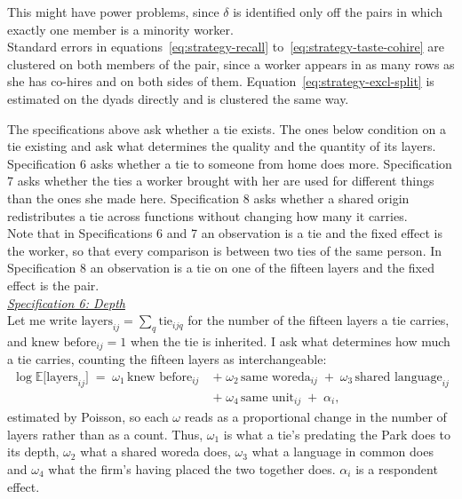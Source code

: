 \noindent This might have power problems, since $\delta$ is identified only off the \pnChanExclOutPairs{} pairs in which exactly one member is a minority worker. \\

\noindent Standard errors in equations~\eqref{eq:strategy-recall} to~\eqref{eq:strategy-taste-cohire} are clustered on both members of the pair, since a worker appears in as many rows as she has co-hires and on both sides of them. Equation~\eqref{eq:strategy-excl-split} is estimated on the dyads directly and is clustered the same way. \\


\noindent The specifications above ask whether a tie exists. The ones below condition on a tie existing and ask what determines the quality and the quantity of its layers. Specification 6 asks whether a tie to someone from home does more. Specification 7 asks whether the ties a worker brought with her are used for different things than the ones she made here. Specification 8 asks whether a shared origin redistributes a tie across functions without changing how many it carries.\\

\noindent Note that in Specifications 6 and 7 an observation is a tie and the fixed effect is the worker, so that every comparison is between two ties of the same person. In Specification 8 an observation is a tie on one of the fifteen layers and the fixed effect is the pair. \\


\noindent \underline{\textit{Specification 6: Depth}} \\[0.4em]
Let me write $\text{layers}_{ij} = \sum_q \text{tie}_{ijq}$ for the number of the fifteen layers a tie carries, and $\text{knew before}_{ij}=1$ when the tie is inherited. I ask what determines how much a tie carries, counting the fifteen layers as interchangeable:
\begin{equation}
\label{eq:strategy-depth}
\begin{split}
\log \mathbb{E}\big[\text{layers}_{ij}\big] \;=\; \omega_1\,\text{knew before}_{ij} \;&+\; \omega_2\,\text{same woreda}_{ij} \;+\; \omega_3\,\text{shared language}_{ij} \\
&+\; \omega_4\,\text{same unit}_{ij} \;+\; \alpha_i,
\end{split}
\end{equation}
estimated by Poisson, so each $\omega$ reads as a proportional change in the number of layers rather than as a count. Thus, $\omega_1$ is what a tie's predating the Park does to its depth, $\omega_2$ what a shared woreda does, $\omega_3$ what a language in common does and $\omega_4$ what the firm's having placed the two together does. $\alpha_i$ is a respondent effect.\\

